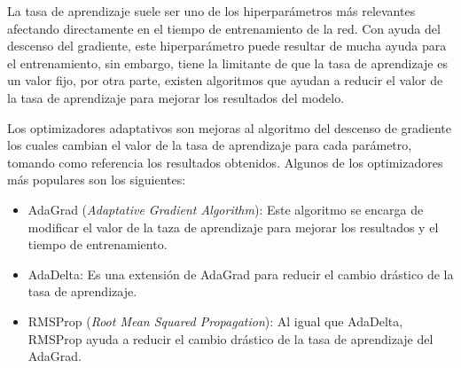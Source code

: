 La tasa de aprendizaje suele ser uno de los hiperparámetros más relevantes afectando directamente en el tiempo de entrenamiento de la red. Con ayuda del descenso del gradiente, este hiperparámetro puede resultar de mucha ayuda para el entrenamiento, sin embargo, tiene la limitante de que la tasa de aprendizaje es un valor fijo, por otra parte, existen algoritmos que ayudan a reducir el valor de la tasa de aprendizaje para mejorar los resultados del modelo.

Los optimizadores adaptativos son mejoras al algoritmo del descenso de gradiente los cuales cambian el valor de la tasa de aprendizaje para cada parámetro, tomando como referencia los resultados obtenidos. Algunos de los optimizadores más populares son los siguientes:

\begin{itemize}
    \item AdaGrad (\textit{Adaptative Gradient Algorithm}): Este algoritmo se encarga de modificar el valor de la taza de aprendizaje para mejorar los resultados y el tiempo de entrenamiento.
    \item AdaDelta: Es una extensión de AdaGrad para reducir el cambio drástico de la tasa de aprendizaje.
    \item RMSProp (\textit{Root Mean Squared Propagation}): Al igual que AdaDelta, RMSProp ayuda a reducir el cambio drástico de la tasa de aprendizaje del AdaGrad.
\end{itemize}

